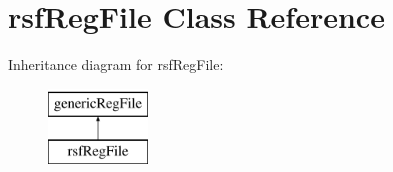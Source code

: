 \hypertarget{classrsf_reg_file}{}\section{rsf\+Reg\+File Class Reference}
\label{classrsf_reg_file}
Inheritance diagram for rsf\+Reg\+File\+:\begin{figure}[H]
\begin{center}
\leavevmode
\includegraphics[height=2.000000cm]{classrsf_reg_file}
\end{center}
\end{figure}

